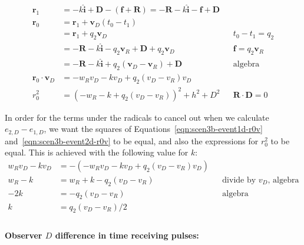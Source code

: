 \documentclass[a4paper]{article}
\theoremstyle{plain}
\theoremstyle{definition}
\newcommand{\vect}[1]{\mathbf{#1}}
\newcommand{\hatvec}[1]{\hat{\mathbf{#1}}}
\begin{document}
\begin{align}
\vect{r}_1 & = -k\hatvec{i} + \vect{D} - (\vect{f} + \vect{R}) = -\vect{R} - k\hatvec{i} - \vect{f} + \vect{D} \nonumber \\
\vect{r}_0
  & = \vect{r}_1 + \vect{v}_D (t_0 - t_1) \nonumber \\
  & = \vect{r}_1 + q_2 \vect{v}_D & & \text{$t_0 - t_1 = q_2$} \nonumber \\
  & = - \vect{R} - k\hatvec{i} - q_2\vect{v}_R + \vect{D} + q_2 \vect{v}_D & & \text{$\vect{f} = q_2 \vect{v}_R$} \nonumber \\
  & = - \vect{R} - k\hatvec{i} + q_2 (\vect{v}_D - \vect{v}_R) + \vect{D} & & \text{algebra} \nonumber \\
\vect{r}_0 \cdot \vect{v}_D & = - w_Rv_D - kv_D + q_2(v_D-v_R)v_D \label{eqn:scen3b-event2d-r0v} \\
r_0^2
  & = (-w_R - k + q_2(v_D-v_R))^2 + h^2 + D^2 & & \text{$\vect{R} \cdot \vect{D} = 0$} \nonumber
\end{align}

In order for the terms under the radicals to cancel out when we
calculate $e_{2,D} - e_{1,D}$, we want
the squares of Equations~\eqref{eqn:scen3b-event1d-r0v}
and~\eqref{eqn:scen3b-event2d-r0v} to be equal, and also the
expressions for $r_0^2$ to be equal.
This is achieved with the following value for $k$:
\begin{align*}
w_Rv_D - kv_D & = -(- w_Rv_D - kv_D + q_2(v_D-v_R)v_D) \\
w_R - k & = w_R + k - q_2(v_D-v_R) & & \text{divide by $v_D$, algebra} \\
-2k & = -q_2(v_D-v_R) & & \text{algebra} \\
k & = q_2(v_D-v_R)/2 \\
\end{align*}


\paragraph{Observer $D$ difference in time receiving pulses:}
\end{document}

